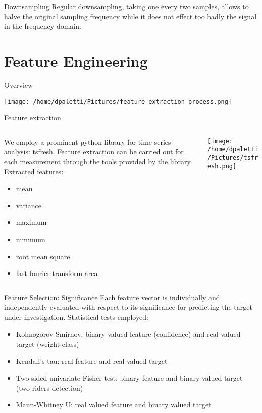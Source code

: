 \documentclass[presentation]{beamer}
\begin{document}
\begin{frame}[label={sec:org8d149a6}]{Downsampling}
Regular downsampling, taking \alert{one every two samples}, allows to halve the original sampling frequency while it does not effect too badly the signal in the frequency domain.
\end{frame}
\section{Feature Engineering}
\label{sec:org6f36c1c}
\begin{frame}[label={sec:orga6b5e57}]{Overview}
\begin{center}
\texttt{[image: /home/dpaletti/Pictures/feature\_extraction\_process.png]}
\end{center}
\end{frame}
\begin{frame}[label={sec:org6aeaaee}]{Feature extraction}
\begin{columns}
\begin{column}[t]{0.5\columnwidth}
We employ a prominent python library for time series analysis: \alert{tsfresh}. \newline
Feature extraction can be carried out for each measurement through the tools provided by the library. \newline
Extracted features:
\begin{itemize}
\item mean
\item variance
\item maximum
\item minimum
\item root mean square
\item fast fourier transform area
\end{itemize}
\end{column}
\begin{column}[t]{0.5\columnwidth}
\begin{center}
\texttt{[image: /home/dpaletti/Pictures/tsfresh.png]}
\end{center}
\end{column}
\end{columns}
\end{frame}
\begin{frame}[label={sec:org4ec0940}]{Feature Selection: Significance}
Each feature vector is individually and independently evaluated with respect to its \alert{significance for predicting the target} under investigation.  \newline
\alert{Statistical tests} employed:
\begin{itemize}
\item Kolmogorov-Smirnov: binary valued feature (confidence) and real valued target (weight class)
\item Kendall’s tau: real feature and real valued target
\item Two-sided univariate Fisher test: binary feature and binary valued target (two riders detection)
\item Mann-Whitney U: real valued feature and binary valued target
\end{itemize}
\end{frame}
\end{document}

